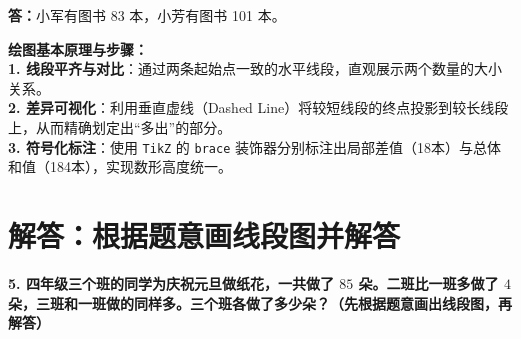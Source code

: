 \vspace{0.2cm}
\noindent\textbf{答：}小军有图书 83 本，小芳有图书 101 本。

\vspace{0.6cm}

{\small\color{blue!70!black}
\textbf{绘图基本原理与步骤：}\\
\textbf{1. 线段平齐与对比}：通过两条起始点一致的水平线段，直观展示两个数量的大小关系。\\
\textbf{2. 差异可视化}：利用垂直虚线（Dashed Line）将较短线段的终点投影到较长线段上，从而精确划定出“多出”的部分。\\
\textbf{3. 符号化标注}：使用 \texttt{TikZ} 的 \texttt{brace} 装饰器分别标注出局部差值（18本）与总体和值（184本），实现数形高度统一。
}

\newpage



\section{解答：根据题意画线段图并解答}

\vspace{0.4cm}

\noindent\textbf{5. 四年级三个班的同学为庆祝元旦做纸花，一共做了 $85$ 朵。二班比一班多做了 $4$ 朵，三班和一班做的同样多。三个班各做了多少朵？（先根据题意画出线段图，再解答）}

\vspace{0.8cm}

